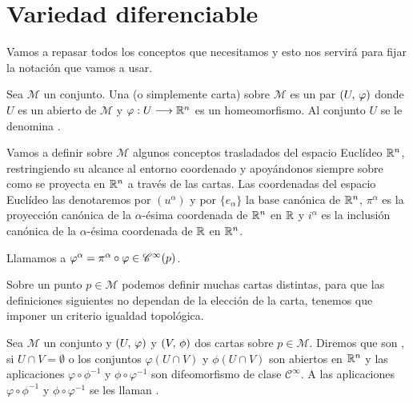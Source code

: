 \section{Variedad diferenciable}\label{sec:variedad-diferenciable}
Vamos a repasar todos los conceptos que necesitamos y esto nos servirá para fijar la notación que vamos a usar.

\begin{definition}
  Sea $\mathcal{M}$ un conjunto.
  Una  (o simplemente carta) sobre $\mathcal{M}$ es un par $
  (U,\thinspace\varphi)$ donde $U$ es un
  abierto de
  $\mathcal{M}$ y $\varphi:U\longrightarrow \mathbb{R}^n$ es un homeomorfismo.
  Al conjunto $U$ se le denomina .
\end{definition}

Vamos a definir sobre $\mathcal{M}$ algunos conceptos trasladados del espacio Euclídeo $\mathbb{R}^n$, restringiendo su
alcance al entorno coordenado y apoyándonos siempre sobre como se proyecta en $\mathbb{R}^n$ a través de las cartas.
Las coordenadas del espacio Euclídeo las denotaremos por $(u^\alpha)$ y por $\{e_\alpha\}$ la base canónica de $\mathbb{R}^n$,
$\pi^\alpha$ es la proyección canónica de la $\alpha$-ésima coordenada de $\mathbb{R}^n$ en $\mathbb{R}$ y $i^\alpha$ es la inclusión
canónica de la $\alpha$-ésima coordenada de $\mathbb{R}$ en $\mathbb{R}^n$.

\begin{definition}
Llamamos  a
$\varphi^\alpha=\pi^\alpha\circ\varphi\in\mathscr{C}^\infty(p)$.
\end{definition}

Sobre un punto $p\in\mathcal{M}$ podemos definir muchas cartas distintas, para que las definiciones siguientes no
dependan de la elección de la carta, tenemos que imponer un criterio igualdad topológica.

\begin{definition}
Sea $\mathcal{M}$ un conjunto y $(U,\thinspace\varphi)$ y $(V,\thinspace\phi)$ dos cartas sobre $p\in\mathcal{M}$.
Diremos que son , si $U\cap V=\emptyset$ o los conjuntos $\varphi
(U\cap V)$ y $\phi(U\cap V)$ son abiertos en $\mathbb{R}^n$ y las aplicaciones $\varphi\circ\phi^{-1}$ y
$\phi\circ\varphi^{-1}$ son difeomorfismo de clase $\mathscr{C}^\infty$.
  A las aplicaciones $\varphi\circ\phi^{-1}$ y $\phi\circ\varphi^{-1}$ se les llaman .
\end{definition}

